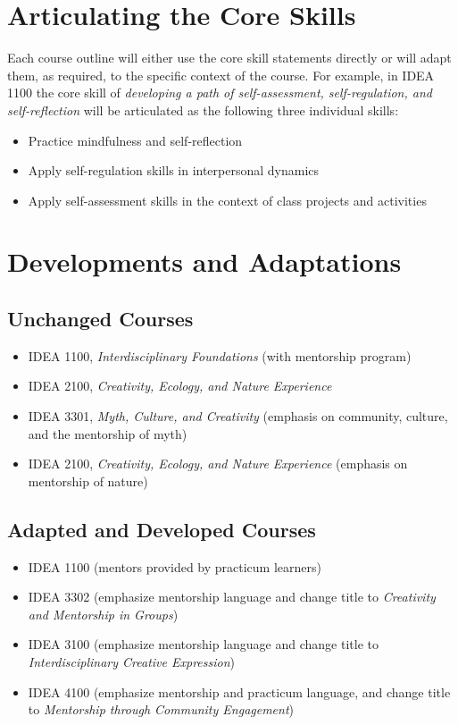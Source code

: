 \documentclass[letterpaper,10pt,headsepline]{scrreprt}
\begin{document}
\section{Articulating the Core Skills}

Each course outline will either use the core skill statements directly
or will adapt them, as required, to the specific context of the course.
For example, in IDEA 1100 the core skill of \emph{developing a path of
self-assessment, self-regulation, and self-reflection} will be
articulated as the following three individual skills:

\begin{itemize}
\itemsep1pt\parskip0pt
\item
  Practice mindfulness and self-reflection
\item
  Apply self-regulation skills in interpersonal dynamics
\item
  Apply self-assessment skills in the context of class projects and
  activities
\end{itemize}

\section{Developments and Adaptations}

\subsection{Unchanged Courses}

\begin{itemize}
\itemsep1pt\parskip0pt
\item
  IDEA 1100, \emph{Interdisciplinary Foundations} (with mentorship
  program)
\item
  IDEA 2100, \emph{Creativity, Ecology, and Nature Experience}
\item
  IDEA 3301, \emph{Myth, Culture, and Creativity} (emphasis on
  community, culture, and the mentorship of myth)
\item
  IDEA 2100, \emph{Creativity, Ecology, and Nature Experience} (emphasis
  on mentorship of nature)
\end{itemize}

\subsection{Adapted and Developed Courses}

\begin{itemize}
\itemsep1pt\parskip0pt
\item
  IDEA 1100 (mentors provided by practicum learners)
\item
  IDEA 3302 (emphasize mentorship language and change title to
  \emph{Creativity and Mentorship in Groups})
\item
  IDEA 3100 (emphasize mentorship language and change title to
  \emph{Interdisciplinary Creative Expression})
\item
  IDEA 4100 (emphasize mentorship and practicum language, and change
  title to \emph{Mentorship through Community Engagement})
\end{itemize}
\end{document}
